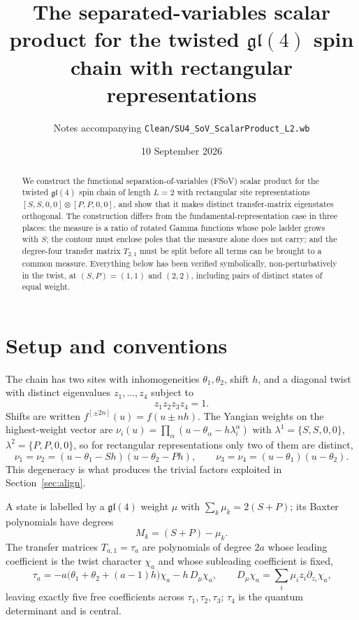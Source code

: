 \documentclass[11pt]{article}
\title{The separated-variables scalar product for the twisted $\mathfrak{gl}(4)$ spin chain
with rectangular representations}
\author{Notes accompanying \texttt{Clean/SU4\_SoV\_ScalarProduct\_L2.wb}}
\date{10 September 2026}
\newcommand{\shift}[1]{^{[#1]}}
\begin{document}
\maketitle

\begin{abstract}
We construct the functional separation-of-variables (FSoV) scalar product for the twisted
$\mathfrak{gl}(4)$ spin chain of length $L=2$ with rectangular site representations
$[S,S,0,0]\otimes[P,P,0,0]$, and show that it makes distinct transfer-matrix eigenstates
orthogonal. The construction differs from the fundamental-representation case in three places: the
measure is a ratio of rotated Gamma functions whose pole ladder grows with $S$; the contour must
enclose poles that the measure alone does not carry; and the degree-four transfer matrix $T_{2,1}$
must be split before all terms can be brought to a common measure. Everything below has been
verified symbolically, non-perturbatively in the twist, at $(S,P)=(1,1)$ and $(2,2)$, including
pairs of distinct states of equal weight.
\end{abstract}

\section{Setup and conventions}

The chain has two sites with inhomogeneities $\theta_1,\theta_2$, shift $h$, and a diagonal twist
with distinct eigenvalues $z_1,\dots,z_4$ subject to
\begin{equation}
z_1 z_2 z_3 z_4 = 1 .
\label{eq:unimodular}
\end{equation}
Shifts are written $f\shift{\pm 2n}(u) = f(u \pm n h)$. The Yangian weights on the highest-weight
vector are $\nu_i(u) = \prod_\alpha (u - \theta_\alpha - h\lambda^\alpha_i)$ with
$\lambda^1 = \{S,S,0,0\}$, $\lambda^2 = \{P,P,0,0\}$, so for rectangular representations only two
of them are distinct,
\begin{equation}
\nu_1 = \nu_2 = (u-\theta_1-Sh)(u-\theta_2-Ph) , \qquad
\nu_3 = \nu_4 = (u-\theta_1)(u-\theta_2) .
\label{eq:nus}
\end{equation}
This degeneracy is what produces the trivial factors exploited in Section~\ref{sec:align}.

A state is labelled by a $\mathfrak{gl}(4)$ weight $\mu$ with $\sum_k \mu_k = 2(S+P)$; its Baxter
polynomials have degrees
\begin{equation}
M_k = (S+P) - \mu_k .
\end{equation}
The transfer matrices $T_{a,1} = \tau_a$ are polynomials of degree $2a$ whose leading coefficient is
the twist character $\chi_a$ and whose subleading coefficient is fixed,
\begin{equation}
[u^{2a-1}]\,\tau_a = -a\big(\theta_1+\theta_2+(a-1)h\big)\chi_a - h\, D_\mu \chi_a ,
\qquad D_\mu \chi_a = \sum_i \mu_i z_i \partial_{z_i}\chi_a ,
\end{equation}
leaving exactly five free coefficients across $\tau_1,\tau_2,\tau_3$; $\tau_4$ is the quantum
determinant and is central.
\end{document}
